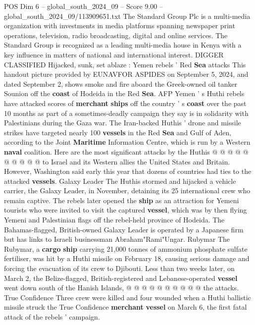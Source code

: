 \begin{textsample}{POS Dim 6 – global\_south\_2024\_09 – Score 9.00 – global\_south\_2024\_09/113909651.txt}  \label{ex:f6_pos_431}
The Standard Group Plc is a multi-media organization with investments in media platforms spanning newspaper print operations, television, radio broadcasting, digital and online services.
The Standard Group is recognized as a leading multi-media house in Kenya with a key influence in matters of national and international interest.
DIGGER CLASSIFIED Hijacked, sunk, set ablaze : Yemen rebels ' Red \textbf{Sea} attacks This handout picture provided by EUNAVFOR ASPIDES on September 5, 2024, and dated September 2, shows smoke and fire aboard the Greek-owned oil tanker Sounion off the \textbf{coast} of Hodeida in the Red \textbf{Sea}.
AFP Yemen ' s Huthi rebels have attacked scores of \textbf{merchant} \textbf{ships} off the country ' s \textbf{coast} over the past 10 months as part of a sometimes-deadly campaign they say is in solidarity with Palestinians during the Gaza war.
The Iran-backed Huthis ' drone and missile strikes have targeted nearly 100 \textbf{vessels} in the Red \textbf{Sea} and Gulf of Aden, according to the Joint \textbf{Maritime} Information Centre, which is run by a Western \textbf{naval} coalition.
Here are the most significant attacks by the Huthis @ @ @ @ @ @ @ @ @ @ to Israel and its Western allies the United States and Britain.
However, Washington said early this year that dozens of countries had ties to the attacked \textbf{vessels}.
Galaxy Leader The Huthis stormed and hijacked a vehicle carrier, the Galaxy Leader, in November, detaining its 25 international crew who remain captive.
The rebels later opened the \textbf{ship} as an attraction for Yemeni tourists who were invited to visit the captured \textbf{vessel}, which was by then flying Yemeni and Palestinian flags off the rebel-held province of Hodeida.
The Bahamas-flagged, British-owned Galaxy Leader is operated by a Japanese firm but has links to Israeli businessman Abraham"Rami"Ungar.
Rubymar The Rubymar, a \textbf{cargo} \textbf{ship} carrying 21,000 tonnes of ammonium phosphate sulfate fertiliser, was hit by a Huthi missile on February 18, causing serious damage and forcing the evacuation of its crew to Djibouti.
Less than two weeks later, on March 2, the Belize-flagged, British-registered and Lebanese-operated \textbf{vessel} went down south of the Hanish Islands, @ @ @ @ @ @ @ @ @ @ the attacks.
True Confidence Three crew were killed and four wounded when a Huthi ballistic missile struck the True Confidence \textbf{merchant} \textbf{vessel} on March 6, the first fatal attack of the rebels ' campaign.

\end{textsample}
